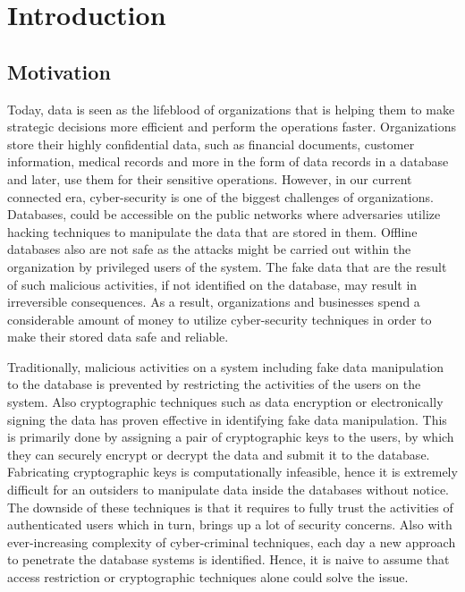 \chapter{Introduction}
\label{chap:introduction}

\section{Motivation}
Today, data is seen as the lifeblood of organizations that is helping them to make strategic decisions more efficient and perform the operations faster. Organizations store their highly confidential data, such as financial documents, customer information, medical records and more in the form of data records in a database and later, use them for their sensitive operations. However, in our current connected era, cyber-security is one of the biggest challenges of organizations. Databases, could be accessible on the public networks where adversaries utilize hacking techniques to manipulate the data that are stored in them. Offline databases also are not safe as the attacks might be carried out within the organization by privileged users of the system. The fake data that are the result of such malicious activities, if not identified on the database, may result in irreversible consequences. As a result, organizations and businesses spend a considerable amount of money to utilize cyber-security techniques in order to make their stored data safe and reliable. 

Traditionally, malicious activities on a system including fake data manipulation to the database is prevented by restricting the activities of the users on the system. Also cryptographic techniques such as data encryption or electronically signing the data has proven effective in identifying fake data manipulation. This is primarily done by assigning a pair of cryptographic keys to the users, by which they can securely encrypt or decrypt the data and submit it to the database. Fabricating cryptographic keys is computationally infeasible, hence it is extremely difficult for an outsiders to manipulate data inside the databases without notice. The downside of these techniques is that it requires to fully trust the activities of authenticated users which in turn, brings up a lot of security concerns. Also with ever-increasing complexity of cyber-criminal techniques, each day a new approach to penetrate the database systems is identified. Hence, it is naive to assume that access restriction or cryptographic techniques alone could solve the issue. 

